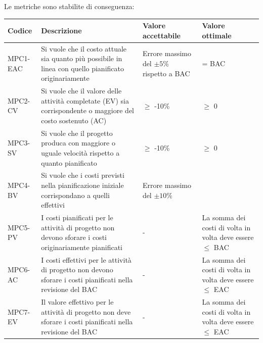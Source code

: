 \newpage
Le metriche sono stabilite di conseguenza:
\begin{table}[h!]
\centering
\def\arraystretch{1.5}
\begin{tabular}{ |>{\centering\arraybackslash}m{2.5cm}|>{\centering\arraybackslash}m{5.5cm}|>{\centering\arraybackslash}m{3cm}|>{\centering\arraybackslash}m{3cm}| }
\hline
\rowcolor{black}
\textbf{\color{white} Codice} & \textbf{\color{white} Descrizione} & \textbf{\color{white} Valore accettabile} & \textbf{\color{white} Valore ottimale}\\
\hline
MPC1-EAC & Si vuole che il costo attuale sia quanto più possibile in linea con quello pianificato originariamente & Errore massimo del $\pm 5$\% rispetto a BAC & = BAC \\
\hline
MPC2-CV & Si vuole che il valore delle attività completate (EV) sia corrispondente o maggiore del costo sostenuto (AC) & $\geq$ -10\% & $\geq$ 0 \\
\hline
MPC3-SV & Si vuole che il progetto produca con maggiore o uguale velocità rispetto a quanto pianificato & $\geq$ -10\% & $\geq$ 0 \\
\hline
MPC4-BV & Si vuole che i costi previsti nella pianificazione iniziale corrispondano a quelli effettivi & Errore massimo del $\pm 10$\% & 0 \\
\hline
MPC5-PV & I costi pianificati per le attività di progetto non devono sforare i costi originariamente pianificati & - & La somma dei costi di volta in volta deve essere $\leq$ BAC \\
\hline
MPC6-AC & I costi effettivi per le attività di progetto non devono sforare i costi pianificati nella revisione del BAC & - & La somma dei costi di volta in volta deve essere $\leq$ EAC \\
\hline
MPC7-EV & Il valore effettivo per le attività di progetto non deve sforare i costi pianificati nella revisione del BAC & - & La somma dei costi di volta in volta deve essere $\leq$ EAC \\
\hline
\end{tabular}
\end{table}

